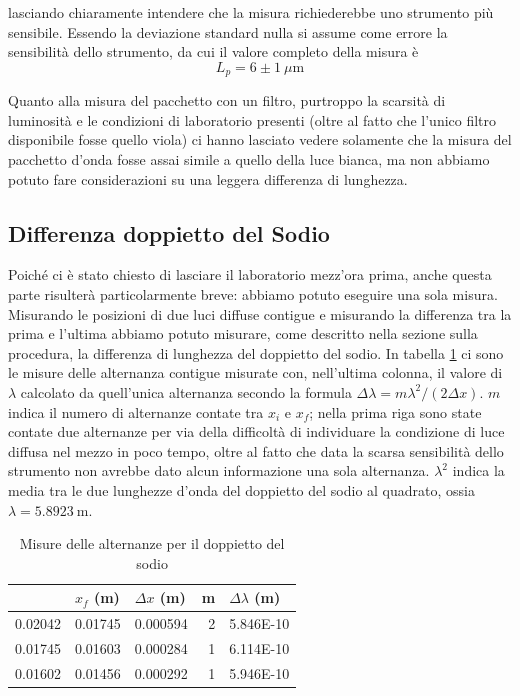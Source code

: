 \documentclass[a4paper,11pt]{article}
\begin{document}
lasciando chiaramente intendere che la misura richiederebbe uno strumento più sensibile. Essendo la deviazione standard nulla si assume come errore la sensibilità dello strumento, da cui il valore completo della misura è $$L _p = 6 \pm 1 \ \mu \text{m}$$

Quanto alla misura del pacchetto con un filtro, purtroppo la scarsità di luminosità e le condizioni di laboratorio presenti (oltre al fatto che l'unico filtro disponibile fosse quello viola) ci hanno lasciato vedere solamente che la misura del pacchetto d'onda fosse assai simile a quello della luce bianca, ma non abbiamo potuto fare considerazioni su una leggera differenza di lunghezza.

\subsection{Differenza doppietto del Sodio}

Poiché ci è stato chiesto di lasciare il laboratorio mezz'ora prima, anche questa parte risulterà particolarmente breve: abbiamo potuto eseguire una sola misura. Misurando le posizioni di due luci diffuse contigue e misurando la differenza tra la prima e l'ultima abbiamo potuto misurare, come descritto nella sezione sulla procedura, la differenza di lunghezza del doppietto del sodio. In tabella \ref{alternanze} ci sono le misure delle alternanza contigue misurate con, nell'ultima colonna, il valore di $\lambda$ calcolato da quell'unica alternanza secondo la formula $\Delta \lambda = m \lambda ^2 / (2 \Delta x)$. $m$ indica il numero di alternanze contate tra $x _i$ e $x_f$; nella prima riga sono state contate due alternanze per via della difficoltà di individuare la condizione di luce diffusa nel mezzo in poco tempo, oltre al fatto che data la scarsa sensibilità dello strumento non avrebbe dato alcun informazione una sola alternanza. $\lambda ^2$ indica la media tra le due lunghezze d'onda del doppietto del sodio al quadrato, ossia $\lambda = \SI{5.8923}{\meter}$.

\begin{table}[htbp]
	\centering
	\caption{Misure delle alternanze per il doppietto del sodio}
	\begin{tabular}{rrrrr}
		\bottomrule
		\rowcolor[rgb]{ .267,  .447,  .769} \multicolumn{1}{l}{\textcolor[rgb]{ 1,  1,  1}{\textbf{$x _i$ (m)}}} & \multicolumn{1}{l}{\textcolor[rgb]{ 1,  1,  1}{\textbf{$x _f$ (m)}}} & \multicolumn{1}{l}{\textcolor[rgb]{ 1,  1,  1}{\textbf{$\Delta x$ (m)}}} & \multicolumn{1}{l}{\textcolor[rgb]{ 1,  1,  1}{\textbf{m}}} & \multicolumn{1}{l}{\textcolor[rgb]{ 1,  1,  1}{\textbf{$\Delta \lambda$ (m)}}} \\
		\toprule
		\rowcolor[rgb]{ .851,  .851,  .851} 0.02042 & 0.01745 & 0.000594 & 2     & 5.846E-10 \\
		0.01745 & 0.01603 & 0.000284 & 1     & 6.114E-10 \\
		\rowcolor[rgb]{ .851,  .851,  .851} 0.01602 & 0.01456 & 0.000292 & 1     & 5.946E-10 \\
		\toprule
	\end{tabular}%
	\label{alternanze}%
\end{table}%
\end{document}
